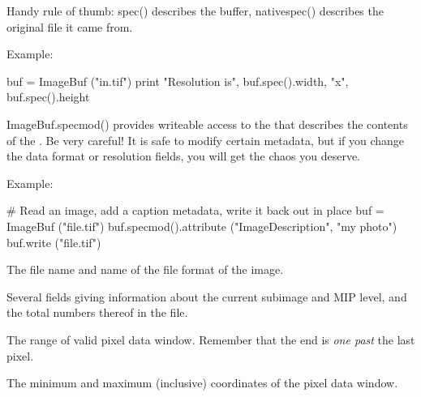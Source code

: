 Handy rule of thumb: {\cf spec()} describes the buffer, {\cf nativespec()}
describes the original file it came from.

\noindent Example:
\begin{code}
    buf = ImageBuf ("in.tif")
    print "Resolution is", buf.spec().width, "x", buf.spec().height
\end{code}
\apiend

{\cf ImageBuf.specmod()} provides writeable access to the \ImageSpec that
describes the contents of the \ImageBuf.  Be very careful!  It is safe
to modify certain metadata, but if you change the data format or resolution
fields, you will get the chaos you deserve.

\noindent Example:
\begin{code}
    # Read an image, add a caption metadata, write it back out in place
    buf = ImageBuf ("file.tif")
    buf.specmod().attribute ("ImageDescription", "my photo")
    buf.write ("file.tif")
\end{code}
\apiend

The file name and name of the file format of the image.
\apiend

Several fields giving information about the current subimage and MIP
level, and the total numbers thereof in the file.
\apiend

The range of valid pixel data window. Remember that the {\cf end} is 
\emph{one past} the last pixel.
\apiend

The minimum and maximum (inclusive) coordinates of the pixel data window.
\apiend


